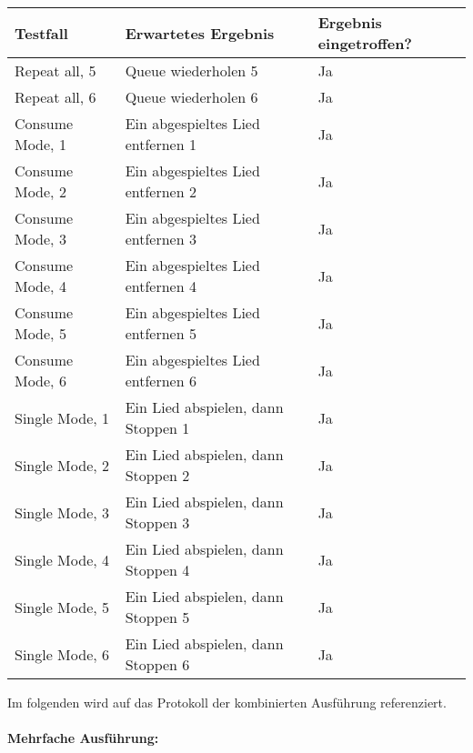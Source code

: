 \begin{tabularx}{\textwidth}{|X|l|X|}
    \hline
    \textbf{Testfall} & \textbf{Erwartetes Ergebnis} & \textbf{Ergebnis eingetroffen?}\\
    \hline
    Repeat all, 5 & Queue wiederholen 5 & Ja\\
    \hline
    Repeat all, 6 & Queue wiederholen 6 & Ja\\
    \hline
    Consume Mode, 1 & Ein abgespieltes Lied entfernen 1 & Ja\\
    \hline
    Consume Mode, 2 & Ein abgespieltes Lied entfernen 2 & Ja\\
    \hline
    Consume Mode, 3 & Ein abgespieltes Lied entfernen 3 & Ja\\
    \hline
    Consume Mode, 4 & Ein abgespieltes Lied entfernen 4 & Ja\\
    \hline
    Consume Mode, 5 & Ein abgespieltes Lied entfernen 5 & Ja\\
    \hline
    Consume Mode, 6 & Ein abgespieltes Lied entfernen 6 & Ja\\    
    \hline   
    Single Mode, 1 & Ein Lied abspielen, dann Stoppen 1 & Ja\\
    \hline
    Single Mode, 2 & Ein Lied abspielen, dann Stoppen 2 & Ja\\
    \hline
    Single Mode, 3 & Ein Lied abspielen, dann Stoppen 3 & Ja\\
    \hline
    Single Mode, 4 & Ein Lied abspielen, dann Stoppen 4 & Ja\\
    \hline
    Single Mode, 5 & Ein Lied abspielen, dann Stoppen 5 & Ja\\
    \hline
    Single Mode, 6 & Ein Lied abspielen, dann Stoppen 6 & Ja\\
    \hline
\end{tabularx}
\newpage
Im folgenden wird auf das Protokoll der kombinierten Ausführung referenziert.\ \\ \\
\textbf{Mehrfache Ausführung:}\ \\ \\
